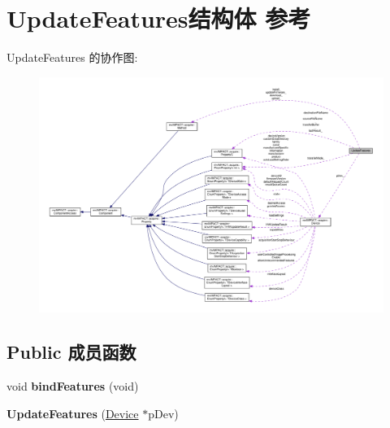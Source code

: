 \hypertarget{struct_update_features}{\section{Update\+Features结构体 参考}
\label{struct_update_features}
}


Update\+Features 的协作图\+:
\nopagebreak
\begin{figure}[H]
\begin{center}
\leavevmode
\includegraphics[width=350pt]{struct_update_features__coll__graph}
\end{center}
\end{figure}
\subsection*{Public 成员函数}
\begin{DoxyCompactItemize}
\item 
\hypertarget{struct_update_features_a078f5f2fb914c8a8d96203122be8513b}{void {\bfseries bind\+Features} (void)}\label{struct_update_features_a078f5f2fb914c8a8d96203122be8513b}

\item 
\hypertarget{struct_update_features_a862869f65e4c18e92516c4e5e3d05ea0}{{\bfseries Update\+Features} (\hyperlink{classmv_i_m_p_a_c_t_1_1acquire_1_1_device}{Device} $\ast$p\+Dev)}\label{struct_update_features_a862869f65e4c18e92516c4e5e3d05ea0}

\end{DoxyCompactItemize}
